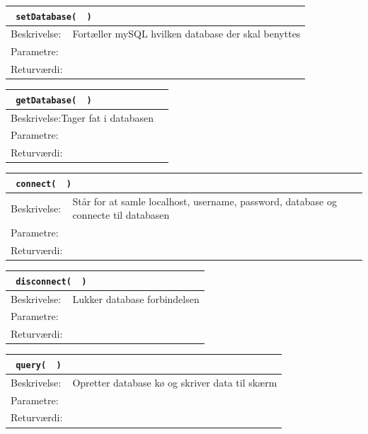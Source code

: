 \begin{table}[H]
\begin{tabular}{l p{12.5cm}}
\multicolumn{2}{l}{\texttt{\textcolor{blue}{} setDatabase( \textcolor{blue}{} )}} \\
\hline
Beskrivelse:&Fortæller mySQL hvilken database der skal benyttes\\
Parametre:&\\
Returværdi:&\\
\end{tabular}
\end{table}

\begin{table}[H]
\begin{tabular}{l p{12.5cm}}
\multicolumn{2}{l}{\texttt{\textcolor{blue}{} getDatabase( \textcolor{blue}{} )}} \\
\hline
Beskrivelse:Tager fat i databasen\\
Parametre:&\\
Returværdi:&\\
\end{tabular}
\end{table}

\begin{table}[H]
\begin{tabular}{l p{12.5cm}}
\multicolumn{2}{l}{\texttt{\textcolor{blue}{} connect( \textcolor{blue}{} )}} \\
\hline
Beskrivelse:&Står for at samle localhost, username, password, database og connecte til databasen\\
Parametre:&\\
Returværdi:&\\
\end{tabular}
\end{table}

\begin{table}[H]
\begin{tabular}{l p{12.5cm}}
\multicolumn{2}{l}{\texttt{\textcolor{blue}{} disconnect( \textcolor{blue}{} )}} \\
\hline
Beskrivelse:&Lukker database forbindelsen\\
Parametre:&\\
Returværdi:&\\
\end{tabular}
\end{table}

\begin{table}[H]
\begin{tabular}{l p{12.5cm}}
\multicolumn{2}{l}{\texttt{\textcolor{blue}{} query( \textcolor{blue}{} )}} \\
\hline
Beskrivelse:&Opretter database kø og skriver data til skærm\\
Parametre:&\\
Returværdi:&\\
\end{tabular}
\end{table}

